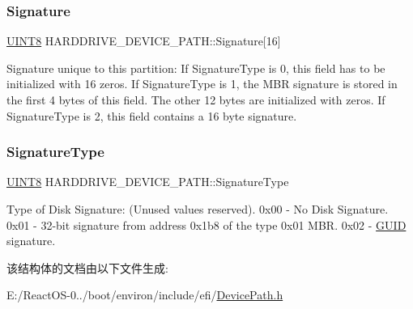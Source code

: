 \subsubsection{\texorpdfstring{Signature}{Signature}}
{\footnotesize\ttfamily \hyperlink{_processor_bind_8h_ab27e9918b538ce9d8ca692479b375b6a}{U\+I\+N\+T8} H\+A\+R\+D\+D\+R\+I\+V\+E\+\_\+\+D\+E\+V\+I\+C\+E\+\_\+\+P\+A\+T\+H\+::\+Signature\mbox{[}16\mbox{]}}

Signature unique to this partition\+: If Signature\+Type is 0, this field has to be initialized with 16 zeros. If Signature\+Type is 1, the M\+BR signature is stored in the first 4 bytes of this field. The other 12 bytes are initialized with zeros. If Signature\+Type is 2, this field contains a 16 byte signature. \mbox{\label{struct_h_a_r_d_d_r_i_v_e___d_e_v_i_c_e___p_a_t_h_a5e46fea12f2a9434c43fe886cad83231}} 
\subsubsection{\texorpdfstring{Signature\+Type}{SignatureType}}
{\footnotesize\ttfamily \hyperlink{_processor_bind_8h_ab27e9918b538ce9d8ca692479b375b6a}{U\+I\+N\+T8} H\+A\+R\+D\+D\+R\+I\+V\+E\+\_\+\+D\+E\+V\+I\+C\+E\+\_\+\+P\+A\+T\+H\+::\+Signature\+Type}

Type of Disk Signature\+: (Unused values reserved). 0x00 -\/ No Disk Signature. 0x01 -\/ 32-\/bit signature from address 0x1b8 of the type 0x01 M\+BR. 0x02 -\/ \hyperlink{interface_g_u_i_d}{G\+U\+ID} signature. 

该结构体的文档由以下文件生成\+:\begin{DoxyCompactItemize}
\item 
E\+:/\+React\+O\+S-\/0../boot/environ/include/efi/\hyperlink{_device_path_8h}{Device\+Path.\+h}\end{DoxyCompactItemize}
